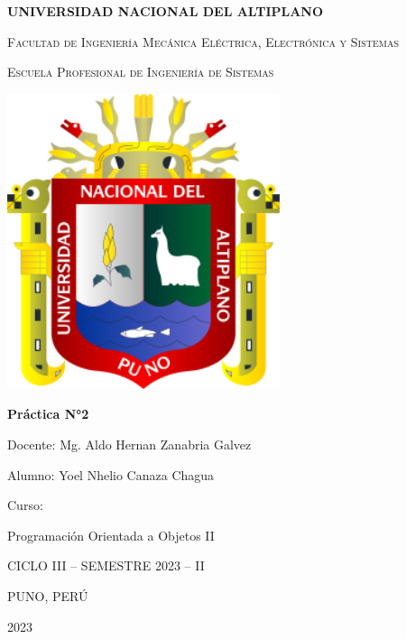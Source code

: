 \documentclass[11pt,a4paper]{article}
\begin{document}
\begin{titlepage}
\centering


{\bfseries\LARGE UNIVERSIDAD NACIONAL DEL ALTIPLANO\par}
{\scshape\LARGE Facultad de Ingeniería Mecánica Eléctrica, Electrónica y Sistemas\par}
{\scshape\LARGE Escuela Profesional de Ingeniería de Sistemas\par}
\vspace{1cm}
{\includegraphics[width=0.6\textwidth]{images/1-unap.png}\par}
\vspace{0.5cm}
{\bfseries\LARGE Práctica N°2\par}
\vspace{1cm}
{\LARGE Docente: Mg. Aldo Hernan Zanabria Galvez \par}

{\LARGE Alumno: Yoel Nhelio Canaza Chagua \par}
\vspace{1cm}
{\LARGE Curso: \par}
{\LARGE Programación Orientada a Objetos II \par}
\vspace{1cm}
{\LARGE CICLO III – SEMESTRE 2023 – II \par}
{\LARGE PUNO, PERÚ \par}
{\LARGE 2023 \par}


\end{titlepage}
\end{document}
